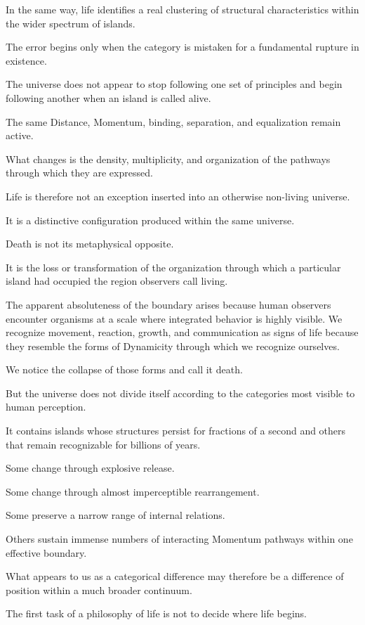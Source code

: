 In the same way, life identifies a real clustering of structural characteristics within the wider spectrum of islands.

The error begins only when the category is mistaken for a fundamental rupture in existence.

The universe does not appear to stop following one set of principles and begin following another when an island is called alive.

The same Distance, Momentum, binding, separation, and equalization remain active.

What changes is the density, multiplicity, and organization of the pathways through which they are expressed.

Life is therefore not an exception inserted into an otherwise non-living universe.

It is a distinctive configuration produced within the same universe.

Death is not its metaphysical opposite.

It is the loss or transformation of the organization through which a particular island had occupied the region observers call living.

The apparent absoluteness of the boundary arises because human observers encounter organisms at a scale where integrated behavior is highly visible. We recognize movement, reaction, growth, and communication as signs of life because they resemble the forms of Dynamicity through which we recognize ourselves.

We notice the collapse of those forms and call it death.

But the universe does not divide itself according to the categories most visible to human perception.

It contains islands whose structures persist for fractions of a second and others that remain recognizable for billions of years.

Some change through explosive release.

Some change through almost imperceptible rearrangement.

Some preserve a narrow range of internal relations.

Others sustain immense numbers of interacting Momentum pathways within one effective boundary.

What appears to us as a categorical difference may therefore be a difference of position within a much broader continuum.

The first task of a philosophy of life is not to decide where life begins.

